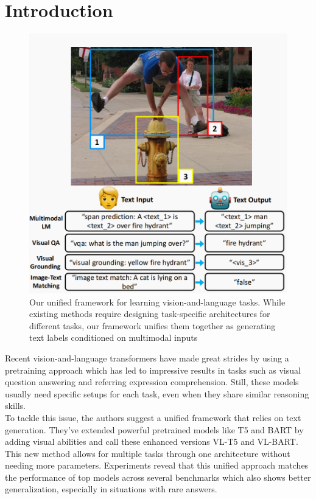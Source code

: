 \documentclass[twocolumn,3p,a4paper,preprint,11pt,margin=2.5cm]{elsarticle}
\begin{document}
\section{\Large{Introduction}}
\vspace{0.3 cm}
\begin{figure}[H]
    \centering
    \includegraphics[width=0.8\linewidth]{image/Image1.png}
    \caption{Our unified framework for learning vision-and-language
tasks. While existing methods require designing task-specific architectures for different tasks, our framework unifies them together
as generating text labels conditioned on multimodal inputs}
    \label{fig:enter-label}
\end{figure}
Recent vision-and-language transformers have made great strides by using a pretraining approach which has led to impressive results in tasks such as visual question answering and referring expression comprehension. Still, these models usually need specific setups for each task, even when they share similar reasoning skills.\\[2pt]
To tackle this issue, the authors suggest a unified framework that relies on text generation. They’ve extended powerful pretrained models like T5 and BART by adding visual abilities and call these enhanced versions VL-T5 and VL-BART.\\[2pt]
This new method allows for multiple tasks through one architecture without needing more parameters. Experiments reveal that this unified approach matches the performance of top models across several benchmarks which also shows better generalization, especially in situations with rare answers.\\
\end{document}
